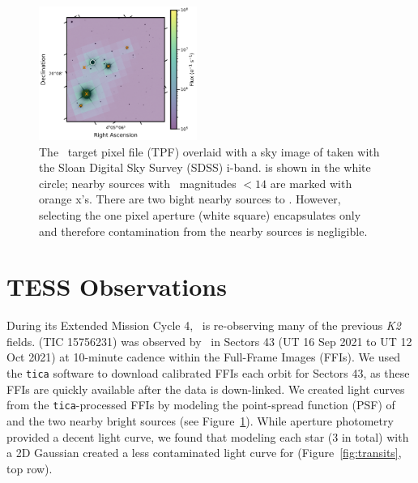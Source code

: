 \documentclass[twocolumn]{aastex631}
\begin{document}
\begin{figure}[!ht]
  \begin{centering}
    \includegraphics[width=0.46\textwidth,trim={0.25cm 0 0 0}]{static/TESSaperture.pdf}
    \caption{The \tess\ target pixel file (TPF) overlaid with a sky image of \sname taken with the Sloan Digital Sky Survey (SDSS) i-band. \sname is shown in the white circle; nearby sources with \tess\ magnitudes $< 14$ are marked with orange x's. There are two bight nearby sources to \sname. However, selecting the one pixel aperture (white square) encapsulates only \sname and therefore contamination from the nearby sources is negligible.} 
    \label{fig:tpf}
  \end{centering}
\end{figure}

\section{TESS Observations} \label{sec:observations}

During its Extended Mission Cycle 4, \tess\ is re-observing many of the previous \textit{K2} fields. \sname (TIC 15756231) was observed by \tess\ in Sectors 43 (UT 16 Sep 2021 to UT 12 Oct 2021) at 10-minute cadence within the Full-Frame Images (FFIs). We used the \texttt{tica} \citep{fausnaugh20} software to download calibrated FFIs each orbit for Sectors 43, as these FFIs are quickly available after the data is down-linked. We created light curves from the \texttt{tica}-processed FFIs by modeling the point-spread function (PSF) of \sname and the two nearby bright sources (see Figure~\ref{fig:tpf}). While aperture photometry provided a decent light curve, we found that modeling each star (3 in total) with a 2D Gaussian created a less contaminated light curve for \sname (Figure~\ref{fig:transits}, top row). %
\end{document}
